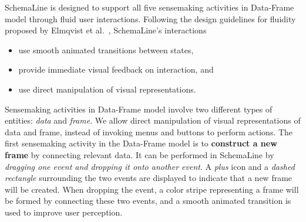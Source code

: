 


SchemaLine is designed to support all five sensemaking activities in Data-Frame model through fluid user interactions. Following the design guidelines for fluidity proposed by Elmqvist et al.~\cite{Elmqvist2011}, SchemaLine's interactions
\begin{itemize}
	\item use smooth animated transitions between states,
	\item provide immediate visual feedback on interaction, and
	\item use direct manipulation of visual representations.
\end{itemize}

Sensemaking activities in Data-Frame model involve two different types of entities: \textit{data} and \textit{frame}. We allow direct manipulation of visual representations of data and frame, instead of invoking menus and buttons to perform actions. The first sensemaking activity in the Data-Frame model is to \textbf{construct a new frame} by connecting relevant data. It can be performed in SchemaLine by \textit{dragging one event and dropping it onto another event}. A \textit{plus} icon and a \textit{dashed rectangle} surrounding the two events are displayed to indicate that a new frame will be created. When dropping the event, a color stripe representing a frame will be formed by connecting these two events, and a smooth animated transition is used to improve user perception.

